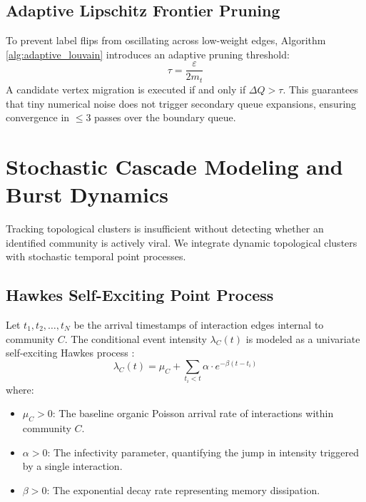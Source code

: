\documentclass[10pt,journal,compsoc]{IEEEtran}
\begin{document}
\subsection{Adaptive Lipschitz Frontier Pruning}
To prevent label flips from oscillating across low-weight edges, Algorithm \ref{alg:adaptive_louvain} introduces an adaptive pruning threshold:
\begin{equation}
\tau = \frac{\varepsilon}{2m_t}
\end{equation}
A candidate vertex migration is executed if and only if $\Delta Q > \tau$. This guarantees that tiny numerical noise does not trigger secondary queue expansions, ensuring convergence in $\le 3$ passes over the boundary queue.

\section{Stochastic Cascade Modeling and Burst Dynamics}\label{sec:burst_models}

Tracking topological clusters is insufficient without detecting whether an identified community is actively viral. We integrate dynamic topological clusters with stochastic temporal point processes.

\subsection{Hawkes Self-Exciting Point Process}
Let $t_1, t_2, \dots, t_N$ be the arrival timestamps of interaction edges internal to community $C$. The conditional event intensity $\lambda_C(t)$ is modeled as a univariate self-exciting Hawkes process \cite{hawkes1971spectra}:
\begin{equation}
\lambda_C(t) = \mu_C + \sum_{t_i < t} \alpha \cdot e^{-\beta (t - t_i)}
\label{eq:hawkes}
\end{equation}
where:
\begin{itemize}
    \item $\mu_C > 0$: The baseline organic Poisson arrival rate of interactions within community $C$.
    \item $\alpha > 0$: The infectivity parameter, quantifying the jump in intensity triggered by a single interaction.
    \item $\beta > 0$: The exponential decay rate representing memory dissipation.
\end{itemize}
\end{document}
